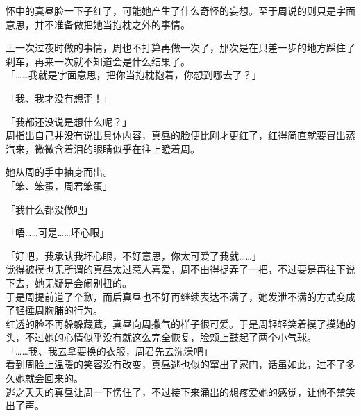 怀中的真昼脸一下子红了，可能她产生了什么奇怪的妄想。至于周说的则只是字面意思，并不准备做把她当抱枕之外的事情。

上一次过夜时做的事情，周也不打算再做一次了，那次是在只差一步的地方踩住了刹车，再来一次就不知道会是什么结果了。\\

「……我就是字面意思，把你当抱枕抱着，你想到哪去了？」

「我、我才没有想歪！」

「我都还没说是想什么呢？」\\

周指出自己并没有说出具体内容，真昼的脸便比刚才更红了，红得简直就要冒出蒸汽来，微微含着泪的眼睛似乎在往上瞪着周。

她从周的手中抽身而出。\\

「笨、笨蛋，周君笨蛋」

「我什么都没做吧」

「唔……可是……坏心眼」

「好吧，我承认我坏心眼，不好意思，你太可爱了我就……」\\

觉得被摸也无所谓的真昼太过惹人喜爱，周不由得捉弄了一把，不过要是再往下说下去，她无疑是会闹别扭的。\\

于是周提前道了个歉，而后真昼也不好再继续表达不满了，她发泄不满的方式变成了轻捶周胸脯的行为。\\

红透的脸不再躲躲藏藏，真昼向周撒气的样子很可爱。于是周轻轻笑着摸了摸她的头，不过她的心情似乎没有就这么完全恢复，脸颊上鼓起了两个小气球。\\

「……我、我去拿要换的衣服，周君先去洗澡吧」\\

看到周脸上温暖的笑容没有改变，真昼逃也似的窜出了家门，话虽如此，过不了多久她就会回来的。\\

逃之夭夭的真昼让周一下愣住了，不过接下来涌出的想疼爱她的感觉，让他不禁笑出了声。
